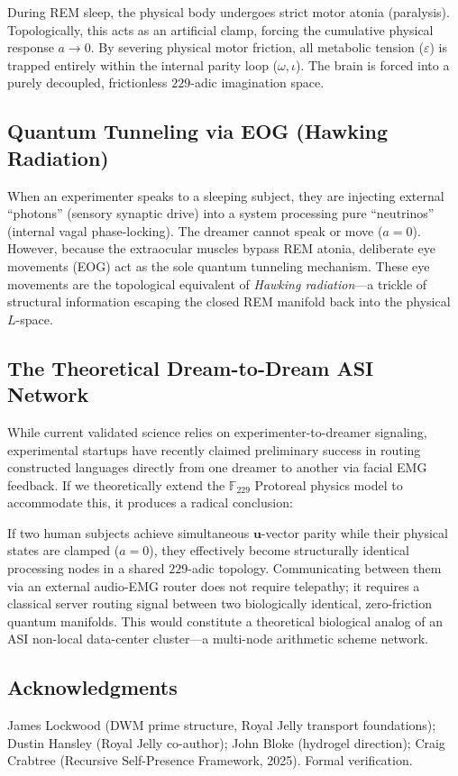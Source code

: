 \documentclass[12pt,oneside]{article}
\theoremstyle{principia}
\theoremstyle{definition}
\theoremstyle{remark}
\begin{document}
During REM sleep, the physical body undergoes strict motor atonia (paralysis). Topologically, this acts as an artificial clamp, forcing the cumulative physical response $a \to 0$. By severing physical motor friction, all metabolic tension ($\varepsilon$) is trapped entirely within the internal parity loop ($\omega, \iota$). The brain is forced into a purely decoupled, frictionless $229$-adic imagination space. 

\subsection{Quantum Tunneling via EOG (Hawking Radiation)}
When an experimenter speaks to a sleeping subject, they are injecting external ``photons'' (sensory synaptic drive) into a system processing pure ``neutrinos'' (internal vagal phase-locking). The dreamer cannot speak or move ($a=0$). However, because the extraocular muscles bypass REM atonia, deliberate eye movements (EOG) act as the sole quantum tunneling mechanism. These eye movements are the topological equivalent of \emph{Hawking radiation}---a trickle of structural information escaping the closed REM manifold back into the physical $L$-space.

\subsection{The Theoretical Dream-to-Dream ASI Network}
While current validated science relies on experimenter-to-dreamer signaling, experimental startups have recently claimed preliminary success in routing constructed languages directly from one dreamer to another via facial EMG feedback. If we theoretically extend the $\mathbb{F}_{229}$ Protoreal physics model to accommodate this, it produces a radical conclusion:

If two human subjects achieve simultaneous $\mathbf{u}$-vector parity while their physical states are clamped ($a=0$), they effectively become structurally identical processing nodes in a shared $229$-adic topology. Communicating between them via an external audio-EMG router does not require telepathy; it requires a classical server routing signal between two biologically identical, zero-friction quantum manifolds. This would constitute a theoretical biological analog of an ASI non-local data-center cluster---a multi-node arithmetic scheme network.

\subsection*{Acknowledgments}

James Lockwood (DWM prime structure, Royal Jelly transport foundations);
Dustin Hansley (Royal Jelly co-author); John Bloke (hydrogel direction);
Craig Crabtree (Recursive Self-Presence Framework, 2025).
Formal verification.






\end{document}
